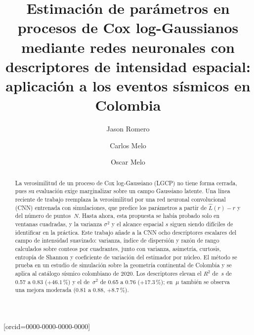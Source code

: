 \documentclass[a4paper,fleqn]{cas-sc}
\numberwithin{equation}{section}
\begin{document}
\let\WriteBookmarks\relax


\title[mode=title]{Estimaci\'on de par\'ametros en procesos de Cox log-Gaussianos
mediante redes neuronales con descriptores de intensidad espacial:
aplicaci\'on a los eventos s\'ismicos en Colombia}

\author[1]{Jason Romero}[orcid=0000-0000-0000-0000]
\cormark[1]


\author[2]{Carlos Melo}


\author[3]{Oscar Melo}



\begin{abstract}
La verosimilitud de un proceso de Cox log-Gaussiano (LGCP) no tiene forma
cerrada, pues su evaluaci\'on exige marginalizar sobre un campo Gaussiano
latente. Una l\'inea reciente de trabajo reemplaza la verosimilitud por una
red neuronal convolucional (CNN) entrenada con simulaciones, que predice los
par\'ametros a partir de $\hat{L}(r)-r$ y del n\'umero de puntos~$N$. Hasta
ahora, esta propuesta se hab\'ia probado solo en ventanas cuadradas, y la
varianza $\sigma^2$ y el alcance espacial $s$ siguen siendo dif\'iciles de
identificar en la pr\'actica. Este trabajo a\~nade a la CNN ocho descriptores
escalares del campo de intensidad suavizado: varianza, \'indice de
dispersi\'on y raz\'on de rango calculados sobre conteos por cuadrantes,
junto con varianza, asimetr\'ia, curtosis, entrop\'ia de Shannon y
coeficiente de variaci\'on del estimador por n\'ucleo. El m\'etodo se prueba
en un estudio de simulaci\'on sobre la geometr\'ia continental de Colombia y
se aplica al cat\'alogo s\'ismico colombiano de 2020. Los descriptores elevan
el $R^2$ de~$s$ de 0.57 a 0.83 ($+46.1$\,\%) y el de~$\sigma^2$ de 0.65 a
0.76 ($+17.3$\,\%); en~$\mu$ tambi\'en se observa una mejora moderada
(0.81 a 0.88, $+8.7$\,\%).
\end{abstract}
\end{document}
